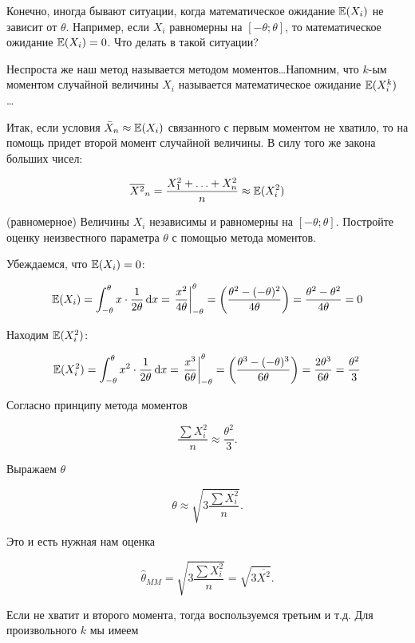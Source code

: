 \documentclass[12pt, a4paper, oneside]{article}
\begin{document}
Конечно, иногда бывают ситуации, когда математическое ожидание $\mathbb{E}(X_{i})$ не зависит от $\theta$. Например, если $X_{i}$ равномерны на $[-\theta; \theta]$, то математическое ожидание $\mathbb{E}(X_{i})=0$. Что делать в такой ситуации? 

Неспроста же наш метод называется методом моментов\ldots  Напомним, что $k$-ым моментом случайной величины $X_{i}$ называется математическое ожидание $\mathbb{E}(X_{i}^{k})$ \ldots 

Итак, если условия $\bar{X}_{n}\approx \mathbb{E}(X_{i})$ связанного с первым моментом не хватило, то на помощь придет второй момент случайной величины. В силу того же закона больших чисел:

\[\overline{X^2}_n = \frac{X_{1}^{2} + \ldots + X_{n}^{2}}{n} \approx \mathbb{E}(X_{i}^{2})\]

\begin{problem}{(равномерное)}
Величины $ X_{i} $ независимы и равномерны на $ [-\theta;\theta] $. Постройте оценку неизвестного параметра $ \theta $ с помощью метода моментов.
\end{problem}

\begin{sol}
Убеждаемся, что $\mathbb{E}(X_{i})=0$:

\[  \mathbb{E}(X_{i}) = \int _{-\theta}^{\theta} x \cdot \frac{1}{2\theta} \,\mathrm{d}x = \left. \frac{x^2}{4 \theta} \right|_{-\theta}^{\theta} = \left( \frac{\theta^2 - (-\theta)^2 }{4 \theta}  \right) =  \frac{\theta^{2} - \theta^{2}}{4 \theta} = 0  \]

Находим $ \mathbb{E}(X_{i}^{2}) $:

\[  \mathbb{E}(X_{i}^{2}) = \int _{-\theta}^{\theta} x^{2} \cdot \frac{1}{2\theta}  \,\mathrm{d}x = \left. \frac{x^3}{6 \theta} \right|_{-\theta}^{\theta} = \left( \frac{\theta^3 - (-\theta)^3 }{6\theta}  \right) = \frac{2 \theta^{3}}{6\theta}  = \frac{\theta^{2}}{3}  \]

Согласно принципу метода моментов

\[ \frac{\sum X_{i}^{2}}{n} \approx \frac{\theta^{2}}{3}.\]

Выражаем $ \theta $

\[ \theta\approx \sqrt{3\frac{\sum X_{i}^{2}}{n} }.\]

Это и есть нужная нам оценка

\[ \hat{\theta}_{MM}= \sqrt{3\frac{\sum X_{i}^{2}}{n} } = \sqrt{3 \overline{X^2 } }.\]
\end{sol}

Если не хватит и второго момента, тогда воспользуемся третьим и т.д. Для произвольного $k$ мы имеем
\end{document}
